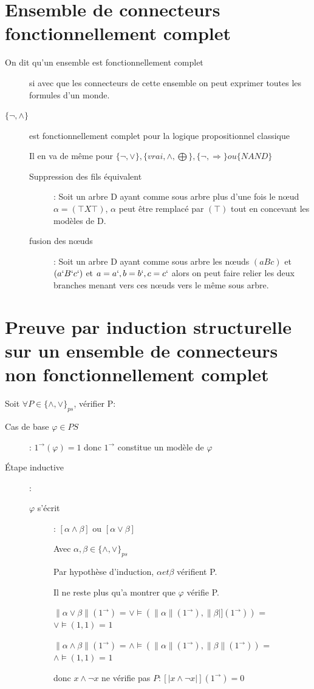 \section{Ensemble de connecteurs fonctionnellement complet}
\begin{description}
\item[On dit qu'un ensemble est fonctionnellement complet] si avec que les connecteurs de cette ensemble on peut exprimer toutes les formules d'un monde.
\item[$\{\neg, \wedge\}$] est fonctionnellement complet pour la logique propositionnel classique
\item[] Il en va de même pour $\{\neg, \vee\}, \{vrai, \wedge, \bigoplus\}, \{\neg, \Rightarrow\} ou \{NAND\}$

\begin{description}
\item[Suppression des fils équivalent]: Soit un arbre D ayant comme sous arbre plus d'une fois le nœud $\alpha = (\top X \top)$, $\alpha$ peut être remplacé par $(\top)$ tout en concevant les modèles de D.
\item[fusion des nœuds]: Soit un arbre D ayant comme sous arbre les nœuds $(a B c)$ et $(a` B` c`)$ et $a = a`, b = b`, c = c`$ alors on peut faire relier les deux branches menant vers ces nœuds vers le même sous arbre.
\end{description}
\end{description}

\section{Preuve par induction structurelle sur un ensemble de connecteurs non fonctionnellement complet}

Soit $ \forall P \in \{ \wedge, \vee \}_{ps}$, vérifier P:
\begin{description}
\item[Cas de base $\varphi \in PS$]: $1^\rightarrow (\varphi) = 1$ donc $1^\rightarrow$ constitue un modèle de $\varphi$
\item[Étape inductive]: 
\begin{description}
\item[$\varphi$ s'écrit]: $[\alpha \wedge \beta]$ ou $[\alpha \vee \beta]$
\item[] Avec $\alpha, \beta \in \{ \wedge, \vee \}_{ps}$
\item[] Par hypothèse d'induction, $\alpha et \beta$ vérifient P.
\item[] Il ne reste plus qu'a montrer que $\varphi$ vérifie P.
\item[] $\| \alpha \vee \beta \| (1^\rightarrow)$ = $\vee \models (\|\alpha \|(1^\rightarrow), \| \beta |](1^\rightarrow))$ = $\vee \models (1,1)$ = $1$
\item[] $\| \alpha \wedge \beta \|(1^\rightarrow)$ = $\wedge \models (\| \alpha \| (1^\rightarrow), \|\beta \|(1^\rightarrow))$ = $\wedge \models (1,1)$ = $1$
\item[] donc $x \wedge \neg x$ ne vérifie pas  $P: [| x \wedge \neg x|](1^\rightarrow) = 0$
\end{description}
\end{description}

